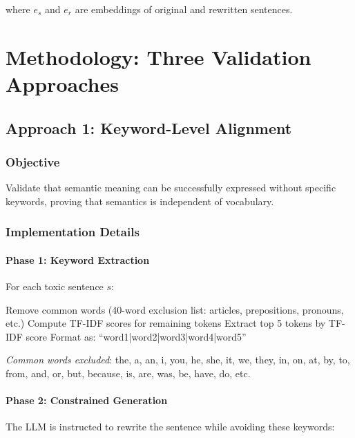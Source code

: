 \documentclass[12pt,a4paper,oneside]{report}
\begin{document}
where $e_s$ and $e_r$ are embeddings of original and rewritten sentences.

\clearpage
\chapter{Methodology: Three Validation Approaches}

\section{Approach 1: Keyword-Level Alignment}

\subsection{Objective}

Validate that semantic meaning can be successfully expressed without specific keywords, proving that semantics is independent of vocabulary.

\subsection{Implementation Details}

\subsubsection{Phase 1: Keyword Extraction}

For each toxic sentence $s$:

\begin{algorithm}
\caption{Keyword Extraction}
\begin{algorithmic}
\State Remove common words (40-word exclusion list: articles, prepositions, pronouns, etc.)
\State Compute TF-IDF scores for remaining tokens
\State Extract top 5 tokens by TF-IDF score
\State Format as: ``word1|word2|word3|word4|word5''
\end{algorithmic}
\end{algorithm}

\textit{Common words excluded}: the, a, an, i, you, he, she, it, we, they, in, on, at, by, to, from, and, or, but, because, is, are, was, be, have, do, etc.

\subsubsection{Phase 2: Constrained Generation}

The LLM is instructed to rewrite the sentence while avoiding these keywords:
\end{document}
